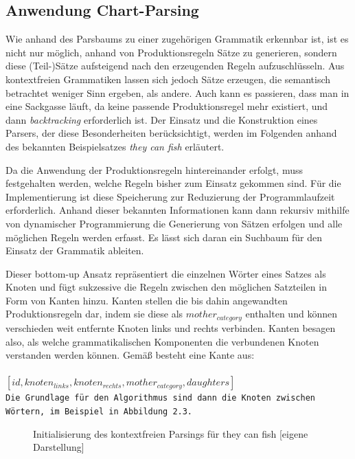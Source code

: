 \documentclass[12pt]{report}
\begin{document}
\subsection{Anwendung Chart-Parsing}
Wie anhand des Parsbaums zu einer zugehörigen Grammatik erkennbar ist, ist es nicht nur möglich, anhand von Produktionsregeln Sätze zu generieren, sondern diese (Teil-)Sätze aufsteigend nach den erzeugenden Regeln aufzuschlüsseln. Aus kontextfreien Grammatiken lassen sich jedoch Sätze erzeugen, die semantisch betrachtet weniger Sinn ergeben, als andere. Auch kann es passieren, dass man in eine Sackgasse läuft, da keine passende Produktionsregel mehr existiert, und dann \textit{backtracking} erforderlich ist. Der Einsatz und die Konstruktion eines Parsers, der diese Besonderheiten berücksichtigt, werden im Folgenden anhand des bekannten Beispielsatzes \textit{they can fish} erläutert.

Da die Anwendung der Produktionsregeln hintereinander erfolgt, muss festgehalten werden, welche Regeln bisher zum Einsatz gekommen sind. Für die Implementierung ist diese Speicherung zur Reduzierung der Programmlaufzeit erforderlich. Anhand dieser bekannten Informationen kann dann rekursiv mithilfe von dynamischer Programmierung die Generierung von Sätzen erfolgen und alle möglichen Regeln werden erfasst. Es lässt sich daran ein Suchbaum für den Einsatz der Grammatik ableiten. 

Dieser bottom-up Ansatz repräsentiert die einzelnen Wörter eines Satzes als Knoten und fügt sukzessive die Regeln zwischen den möglichen Satzteilen in Form von Kanten hinzu. Kanten stellen die bis dahin angewandten Produktionsregeln dar, indem sie diese als \textit{$mother_{category}$} enthalten und können verschieden weit entfernte Knoten links und rechts verbinden. Kanten besagen also, als welche grammatikalischen Komponenten die verbundenen Knoten verstanden werden können. Gemäß \cite{cop04} besteht eine Kante aus:
\\
\tt
\\$[id, knoten_{links}, knoten_{rechts}, mother_{category}, daughters]$
\rm
\\

Die Grundlage für den Algorithmus sind dann die Knoten zwischen Wörtern, im Beispiel in Abbildung 2.3.\\

\begin{figure}[h!]
\begin{center}
\caption{Initialisierung des kontextfreien Parsings für \glqq  they can fish\grqq{} [eigene Darstellung]}
\end{center}
\end{figure}
\end{document}
